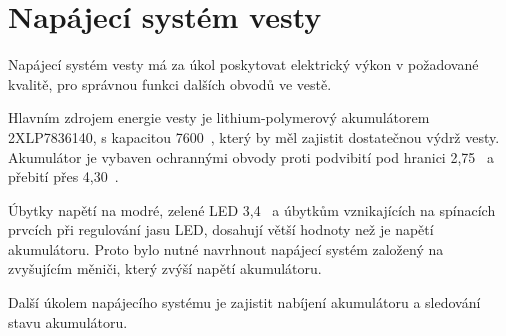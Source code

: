 \chapter{Napájecí systém vesty}
Napájecí systém vesty má za úkol poskytovat elektrický výkon v požadované kvalitě, pro správnou funkci dalších obvodů ve vestě.

Hlavním zdrojem energie vesty je lithium-polymerový akumulátorem 2XLP7836140, s kapacitou 7600~, který by měl zajistit dostatečnou výdrž vesty. Akumulátor je vybaven ochrannými obvody proti podvibití pod hranici 2,75~ a přebití přes 4,30~.

Úbytky napětí na modré, zelené LED 3,4~ a úbytkům vznikajících na spínacích prvcích při regulování jasu LED, dosahují větší hodnoty než je napětí akumulátoru. Proto bylo nutné navrhnout napájecí systém založený na zvyšujícím měniči, který zvýší napětí akumulátoru.

Další úkolem napájecího systému je zajistit nabíjení akumulátoru a sledování stavu akumulátoru.


